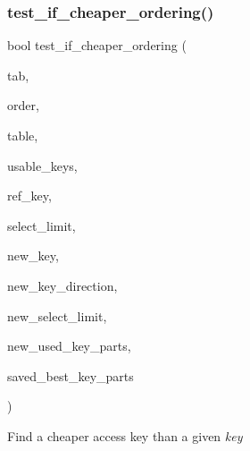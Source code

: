 \subsubsection{\texorpdfstring{test\+\_\+if\+\_\+cheaper\+\_\+ordering()}{test\_if\_cheaper\_ordering()}}
{\footnotesize\ttfamily bool test\+\_\+if\+\_\+cheaper\+\_\+ordering (\begin{DoxyParamCaption}\item[{const \mbox{\hyperlink{classJOIN__TAB}{J\+O\+I\+N\+\_\+\+T\+AB}} $\ast$}]{tab,  }\item[{\mbox{\hyperlink{structst__order}{O\+R\+D\+ER}} $\ast$}]{order,  }\item[{\mbox{\hyperlink{structTABLE}{T\+A\+B\+LE}} $\ast$}]{table,  }\item[{\mbox{\hyperlink{classBitmap_3_0164_01_4}{key\+\_\+map}}}]{usable\+\_\+keys,  }\item[{int}]{ref\+\_\+key,  }\item[{ha\+\_\+rows}]{select\+\_\+limit,  }\item[{int $\ast$}]{new\+\_\+key,  }\item[{int $\ast$}]{new\+\_\+key\+\_\+direction,  }\item[{ha\+\_\+rows $\ast$}]{new\+\_\+select\+\_\+limit,  }\item[{uint $\ast$}]{new\+\_\+used\+\_\+key\+\_\+parts,  }\item[{uint $\ast$}]{saved\+\_\+best\+\_\+key\+\_\+parts }\end{DoxyParamCaption})}

Find a cheaper access key than a given {\itshape key} 


